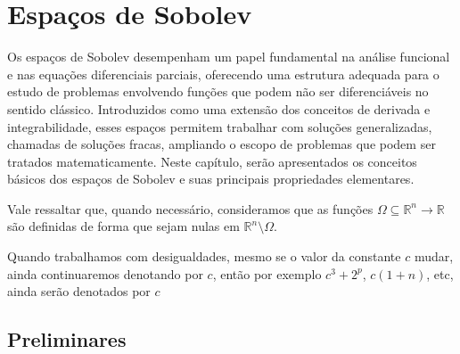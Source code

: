 \documentclass[a4paper, 11pt]{book}
\theoremstyle{definition}
\newcommand{\bN}{\mathbb{N}}
\newcommand{\bR}{\mathbb{R}}
\newcommand{\bK}{\mathbb{K}}
\newcommand{\cC}{\mathcal{C}}
\begin{document}




\chapter{Espaços de Sobolev} \label{ch:sobolev}

Os espaços de Sobolev desempenham um papel fundamental na análise funcional e nas equações diferenciais parciais, oferecendo uma estrutura adequada para o estudo de problemas envolvendo funções que podem não ser diferenciáveis no sentido clássico. Introduzidos como uma extensão dos conceitos de derivada e integrabilidade, esses espaços permitem trabalhar com soluções generalizadas, chamadas de soluções fracas, ampliando o escopo de problemas que podem ser tratados matematicamente. Neste capítulo, serão apresentados os conceitos básicos dos espaços de Sobolev e suas principais propriedades elementares.

Vale ressaltar que, quando necessário, consideramos que as funções $\Omega \subseteq \bR^n \to \bR$ são definidas de forma que sejam nulas em $\bR^n \setminus \Omega$. 

Quando trabalhamos com desigualdades, mesmo se o valor da constante $c$ mudar, ainda continuaremos denotando por $c$, então por exemplo $c^3 + 2^p$, $c(1 + n)$, etc, ainda serão denotados por $c$

\section{Preliminares}
\end{document}
